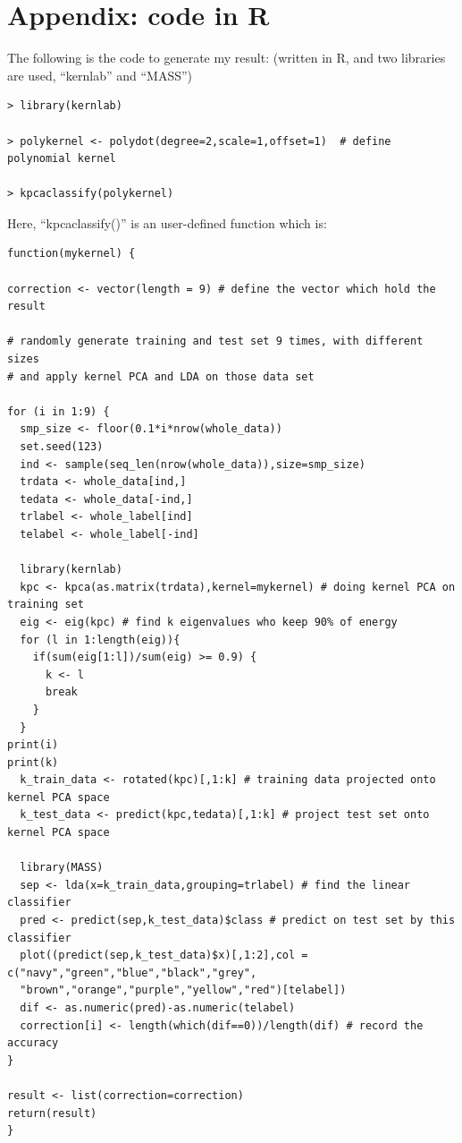 \documentclass{article}
\begin{document}
\appendix

\section{Appendix: code in R}

The following is the code to generate my result: (written in R, and two libraries are used, ``kernlab'' and ``MASS'')

{\color{lightgray} \begin{verbatim}
> library(kernlab)

> polykernel <- polydot(degree=2,scale=1,offset=1)  # define polynomial kernel

> kpcaclassify(polykernel)
\end{verbatim}}

Here, ``kpcaclassify()'' is an user-defined function which is:

{\color{lightgray} \begin{verbatim}
function(mykernel) {

correction <- vector(length = 9) # define the vector which hold the result

# randomly generate training and test set 9 times, with different sizes
# and apply kernel PCA and LDA on those data set

for (i in 1:9) {
  smp_size <- floor(0.1*i*nrow(whole_data))
  set.seed(123)
  ind <- sample(seq_len(nrow(whole_data)),size=smp_size)
  trdata <- whole_data[ind,]
  tedata <- whole_data[-ind,]
  trlabel <- whole_label[ind]
  telabel <- whole_label[-ind]

  library(kernlab)
  kpc <- kpca(as.matrix(trdata),kernel=mykernel) # doing kernel PCA on training set
  eig <- eig(kpc) # find k eigenvalues who keep 90% of energy
  for (l in 1:length(eig)){
    if(sum(eig[1:l])/sum(eig) >= 0.9) {
      k <- l
      break
    }
  }
print(i)
print(k)
  k_train_data <- rotated(kpc)[,1:k] # training data projected onto kernel PCA space
  k_test_data <- predict(kpc,tedata)[,1:k] # project test set onto kernel PCA space
  
  library(MASS)
  sep <- lda(x=k_train_data,grouping=trlabel) # find the linear classifier
  pred <- predict(sep,k_test_data)$class # predict on test set by this classifier
  plot((predict(sep,k_test_data)$x)[,1:2],col = c("navy","green","blue","black","grey",
  "brown","orange","purple","yellow","red")[telabel])
  dif <- as.numeric(pred)-as.numeric(telabel)
  correction[i] <- length(which(dif==0))/length(dif) # record the accuracy
}

result <- list(correction=correction)
return(result)
}

\end{verbatim}}
\end{document}
